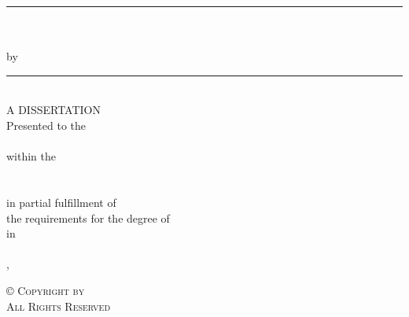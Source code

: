 \vspace*{\fill}
\begin{center}
\doublespaced
\rule{16cm}{1pt}\\
\MakeUppercase{\projecttitle{}} \\ 
by \projectauthor{} \\
\rule{16cm}{1pt}\\
\singlespaced
\vspace{20pt}
A DISSERTATION\\\vspace{30pt}
Presented to the\\\vspace{10pt}
\department{}\\\vspace{10pt}
within the \\\vspace{10pt}
\institution{}\\\vspace{10pt}
\school{}\\\vspace{10pt}
in partial fulfillment of\\\vspace{10pt}
the requirements for the degree of\\\vspace{10pt}
\degree{}  in\\\vspace{10pt}
\track{}\\\vspace{10pt}
\vspace{30pt}
\completionmonth{}, \completionyear{}\\
\end{center}
\vspace*{\fill}
\clearpage

\vspace*{\fill}
\begin{center}
\doublespaced
\scshape \copyright \hspace{3pt} Copyright \completionyear{} by \projectauthor{}\\
All Rights Reserved
\end{center}
\vspace*{\fill}
\clearpage

